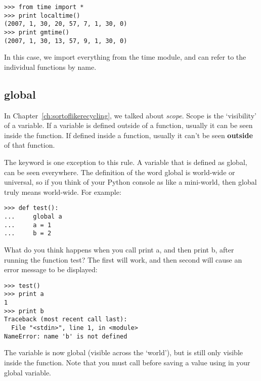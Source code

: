 \begin{listingignore}
\begin{verbatim}
>>> from time import *
>>> print localtime()
(2007, 1, 30, 20, 57, 7, 1, 30, 0)
>>> print gmtime()
(2007, 1, 30, 13, 57, 9, 1, 30, 0)
\end{verbatim}
\end{listingignore}

In this case, we import everything from the time module, and can refer to the individual functions by name.

\subsection*{global}

In Chapter~\ref{ch:sortoflikerecycling}, we talked about \emph{scope}.  Scope is the `visibility' of a variable. If a variable is defined outside of a function, usually it can be seen inside the function. If defined inside a function, usually it can't be seen \textbf{outside} of that function.
\par
The  keyword is one exception to this rule. A variable that is defined as global, can be seen everywhere. The definition of the word global is world-wide or universal, so if you think of your Python console as like a mini-world, then global truly means world-wide.  For example:

\begin{listing}
\begin{verbatim}
>>> def test():
...     global a
...     a = 1
...     b = 2
\end{verbatim}
\end{listing}

What do you think happens when you call print a, and then print b, after running the function test?  The first will work, and then second will cause an error message to be displayed:

\begin{listing}
\begin{verbatim}
>>> test()
>>> print a
1
>>> print b
Traceback (most recent call last):
  File "<stdin>", line 1, in <module>
NameError: name 'b' is not defined
\end{verbatim}
\end{listing}

The variable  is now global (visible across the `world'), but  is still only visible inside the function.  Note that you must call  before saving a value using in your global variable.

